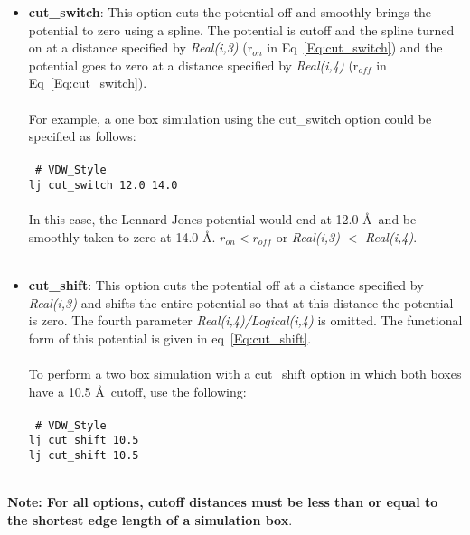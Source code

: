 \begin{itemize}
%
\item \textbf{cut\_switch}: This option cuts the potential off and smoothly
brings the potential to zero using a spline. The potential is cutoff
and the spline turned on at a distance specified by \emph{Real(i,3)}
(r$_{on}$ in Eq~\ref{Eq:cut_switch}) and the potential goes
to zero at a distance specified by \emph{Real(i,4)} (r$_{off}$ in
Eq~\ref{Eq:cut_switch}). \\ \\
%
For example, a one box simulation using the cut\_switch option could be
specified as follows:
\\ \\
\texttt{
\# VDW\_Style \\
lj cut\_switch 12.0 14.0} \\ \\
%
In this case, the Lennard-Jones potential would end at 12.0 \AA\ and
be smoothly taken to zero at 14.0 \AA. $r_{on} < r_{off}$ or \emph{Real(i,3)} $<$ \emph{Real(i,4)}.
%
\\ \\
\item \textbf{cut\_shift}: This option cuts the potential off at a distance
specified by \emph{Real(i,3)} and shifts the entire potential so that
at this distance the potential is zero. The fourth parameter
\emph{Real(i,4)/Logical(i,4)} is omitted. The functional form of this
potential is given in eq~\ref{Eq:cut_shift}. \\ \\
%
To perform a two box simulation with a cut\_shift option in which both
boxes have a 10.5 \AA\ cutoff, use the following:
\\ \\
\texttt{
\# VDW\_Style \\
lj cut\_shift 10.5 \\
lj cut\_shift 10.5 } \\ \\
%
\end{itemize}
{\bf Note: For all options, cutoff distances must be less than or
  equal to the shortest edge length of a simulation box}.
%
%
